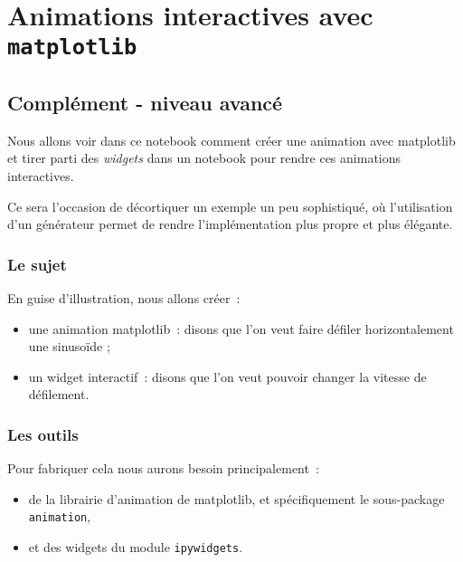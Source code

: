     
    
    
    

    

    \hypertarget{animations-interactives-avec-matplotlib}{%
\section{\texorpdfstring{Animations interactives avec
\texttt{matplotlib}}{Animations interactives avec matplotlib}}\label{animations-interactives-avec-matplotlib}}

    \hypertarget{compluxe9ment---niveau-avancuxe9}{%
\subsection{Complément - niveau
avancé}\label{compluxe9ment---niveau-avancuxe9}}

    Nous allons voir dans ce notebook comment créer une animation avec
matplotlib et tirer parti des \emph{widgets} dans un notebook pour
rendre ces animations interactives.

Ce sera l'occasion de décortiquer un exemple un peu sophistiqué, où
l'utilisation d'un générateur permet de rendre l'implémentation plus
propre et plus élégante.

    \hypertarget{le-sujet}{%
\subsubsection{Le sujet}\label{le-sujet}}

    En guise d'illustration, nous allons créer~:

\begin{itemize}
\tightlist
\item
  une animation matplotlib~: disons que l'on veut faire défiler
  horizontalement une sinusoïde ;
\item
  un widget interactif~: disons que l'on veut pouvoir changer la vitesse
  de défilement.
\end{itemize}

    \hypertarget{les-outils}{%
\subsubsection{Les outils}\label{les-outils}}

    Pour fabriquer cela nous aurons besoin principalement~:

\begin{itemize}
\tightlist
\item
  de la librairie d'animation de matplotlib, et spécifiquement le
  sous-package \texttt{animation},
\item
  et des widgets du module \texttt{ipywidgets}.
\end{itemize}

